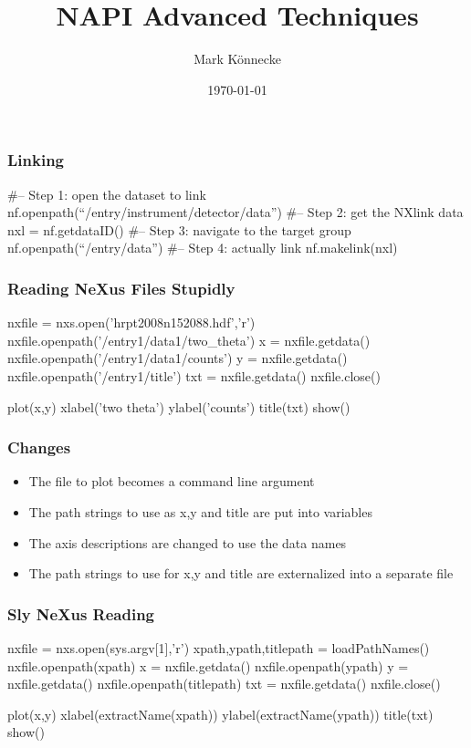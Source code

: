 \documentclass{beamer}
\title{NAPI Advanced Techniques}
\author{Mark K\"onnecke }
\institute{Paul Scherrer Institute\\Switzerland }
\date{\today}
\begin{document}
\begin{frame}
\titlepage
\end{frame}

\begin{frame}[fragile]
\frametitle{Linking}
\begin{semiverbatim}
#-- Step 1: open the dataset to link
nf.openpath(``/entry/instrument/detector/data'')
#-- Step 2: get the NXlink data
nxl = nf.getdataID()
#-- Step 3: navigate to the target group
nf.openpath(``/entry/data'')
#-- Step 4: actually link
nf.makelink(nxl)
\end{semiverbatim}
\end{frame}

\begin{frame}[fragile]
\frametitle{Reading NeXus Files Stupidly}
\begin{semiverbatim}
nxfile = nxs.open('hrpt2008n152088.hdf','r')
nxfile.openpath('/entry1/data1/two_theta')
x = nxfile.getdata()
nxfile.openpath('/entry1/data1/counts')
y = nxfile.getdata()
nxfile.openpath('/entry1/title')
txt = nxfile.getdata()
nxfile.close()

plot(x,y)
xlabel('two theta')
ylabel('counts')
title(txt)
show()
\end{semiverbatim}
\end{frame}

\begin{frame} \frametitle{Changes}
\begin{itemize}
\item<1->The file to plot becomes a command line argument
\item<2->The path strings to use as x,y and title are put into variables
\item<3->The axis descriptions are changed to use the data names
\item<4->The path strings to use for x,y and title are externalized into a separate 
 file
\end{itemize}
\end{frame}

\begin{frame}[fragile]
\frametitle{Sly NeXus Reading}
\begin{semiverbatim}
nxfile = nxs.open(sys.argv[1],'r')
xpath,ypath,titlepath = loadPathNames()
nxfile.openpath(xpath)
x = nxfile.getdata()
nxfile.openpath(ypath)
y = nxfile.getdata()
nxfile.openpath(titlepath)
txt = nxfile.getdata()
nxfile.close()

plot(x,y)
xlabel(extractName(xpath))
ylabel(extractName(ypath))
title(txt)
show()
\end{semiverbatim}
\end{frame}
\end{document}
